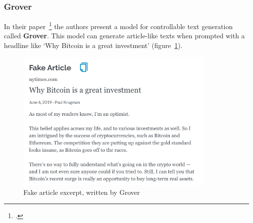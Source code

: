 \subsubsection{Grover}
\label{sub:grover}

In their paper~\footcite{zellers2019neuralfakenews} the authors present a model for controllable text generation called \textbf{Grover}. This model can generate article-like texts when prompted with a headline like `Why Bitcoin is a great investment' (figure~\ref{fig:grover}).

\begin{figure}[h]
  	\includegraphics[height=7cm]{img/grover_fake_article}
  	\caption{Fake article excerpt, written by Grover}
	\label{fig:grover}
\end{figure}

